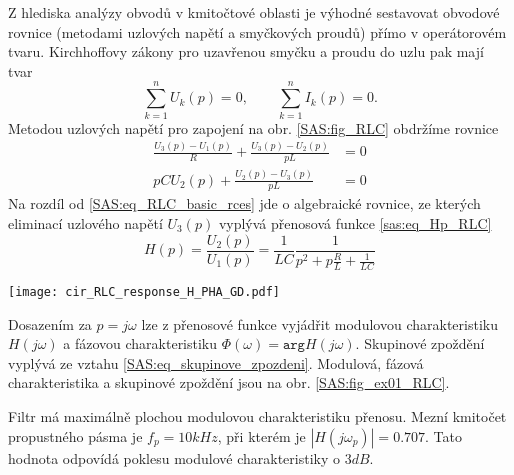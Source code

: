 \begin{example}
  Z hlediska analýzy obvodů v kmitočtové oblasti je výhodné sestavovat obvodové rovnice (metodami
  uzlových napětí a smyčkových proudů) přímo v operátorovém tvaru. Kirchhoffovy zákony pro
  uzavřenou smyčku a proudu do uzlu pak mají tvar $$\sum_{k=1}^{n}U_k(p) = 0, \qquad
  \sum_{k=1}^{n}I_k(p) = 0.$$ Metodou uzlových napětí pro zapojení na obr. \ref{SAS:fig_RLC}
  obdržíme rovnice
  \begin{align}
    \frac{U_3(p)-U_1(p)}{R}+\frac{U_3(p)-U_2(p)}{pL} &=  0 \\
    pCU_2(p) + \frac{U_2(p)-U_3(p)}{pL}              &=  0 
  \end{align}
  Na rozdíl od \ref{SAS:eq_RLC_basic_rces} jde o algebraické rovnice, ze kterých eliminací
  uzlového napětí $U_3(p)$ vyplývá přenosová funkce \ref{sas:eq_Hp_RLC} $$H(p) =
  \frac{U_2(p)}{U_1(p)}=\frac{1}{LC}\frac{1}{p^2+p\frac{R}{L}+\frac{1}{LC}}$$
  
   {\centering
    \texttt{[image: cir\_RLC\_response\_H\_PHA\_GD.pdf]}
    \label{SAS:fig_ex01_RLC}
    \par}    
  
  Dosazením za $p=j\omega$ lze z přenosové funkce vyjádřit modulovou charakteristiku $H(j\omega)$
  a fázovou charakteristiku $\Phi(\omega)= \texttt{arg} H(j\omega)$. Skupinové zpoždění vyplývá
  ze vztahu \ref{SAS:eq_skupinove_zpozdeni}. Modulová, fázová charakteristika a skupinové
  zpoždění jsou na obr. \ref{SAS:fig_ex01_RLC}.
  
  Filtr má maximálně plochou modulovou charakteristiku přenosu. Mezní kmitočet propustného pásma
  je $f_p = 10 kHz$, při kterém je $|H(j\omega_p)|= 0.707$. Tato hodnota odpovídá poklesu
  modulové charakteristiky o $3 dB$.
  
  
  \begin{lstlisting}[caption=TKY\_exam\_03\_Hp.m]
  \end{lstlisting}
\end{example} 